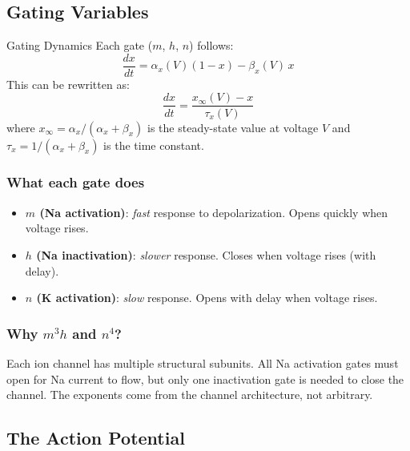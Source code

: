 \documentclass[11pt]{article}
\begin{document}
\subsection{Gating Variables}

\begin{conceptbox}{Gating Dynamics}
Each gate ($m$, $h$, $n$) follows:
\[
\frac{dx}{dt} = \alpha_x(V)(1-x) - \beta_x(V)\,x
\]
This can be rewritten as:
\[
\frac{dx}{dt} = \frac{x_\infty(V) - x}{\tau_x(V)}
\]
where $x_\infty = \alpha_x/(\alpha_x + \beta_x)$ is the steady-state value at voltage $V$ and $\tau_x = 1/(\alpha_x + \beta_x)$ is the time constant.
\end{conceptbox}

\subsubsection{What each gate does}
\begin{itemize}
\item \textbf{$m$ (Na activation)}: \emph{fast} response to depolarization. Opens quickly when voltage rises.
\item \textbf{$h$ (Na inactivation)}: \emph{slower} response. Closes when voltage rises (with delay).
\item \textbf{$n$ (K activation)}: \emph{slow} response. Opens with delay when voltage rises.
\end{itemize}

\subsubsection{Why $m^3 h$ and $n^4$?} Each ion channel has multiple structural subunits. All Na activation gates must open for Na current to flow, but only one inactivation gate is needed to close the channel. The exponents come from the channel architecture, not arbitrary.

\subsection{The Action Potential}
\end{document}
